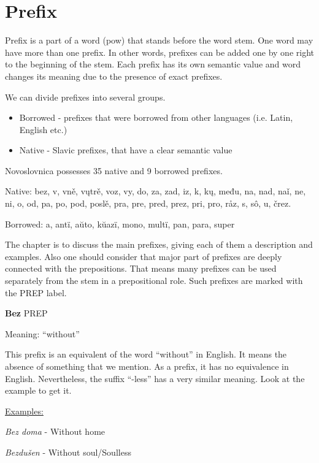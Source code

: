 \section{Prefix}


Prefix is a part of a word (\gls{pow}) that stands before the word stem. One word may have more than one prefix. In other words, prefixes can be added one by one right to the beginning of the stem. Each prefix has its own semantic value and word changes its meaning due to the presence of exact prefixes.

We can divide prefixes into several groups. 

\begin{itemize}
	\item Borrowed - prefixes that were borrowed from other languages (i.e. Latin, English etc.)
	\item Native - Slavic prefixes, that have a clear semantic value
\end{itemize}

Novoslovnica possesses 35 native and 9 borrowed prefixes.

Native: bez, v, vně, vųtrě, voz, vy, do, za, zad, iz, k, kų, među, na, nad, naǐ, ne, ni, o, od, pa, po, pod, poslě, pra, pre, pred, prez, pri, pro, råz, s, sô, u, črez.

Borrowed: a, antï, aŭto, kŭazï, mono, multï, pan, para, super

The chapter is to discuss the main prefixes, giving each of them a description and examples. Also one should consider that major part of prefixes are deeply connected with the prepositions. That means many prefixes can be used separately from the stem in a prepositional role. Such prefixes are marked with the PREP label. 

\textbf{Bez} PREP

Meaning: “without”

This prefix is an equivalent of the word “without” in English. It means the absence of something that we mention. As a prefix, it has no equivalence in English. Nevertheless, the suffix “-less” has a very similar meaning. Look at the example to get it.

\underline{Examples:}

\textit{Bez doma} - Without home

\textit{Bezdušen} - Without soul/Soulless 


